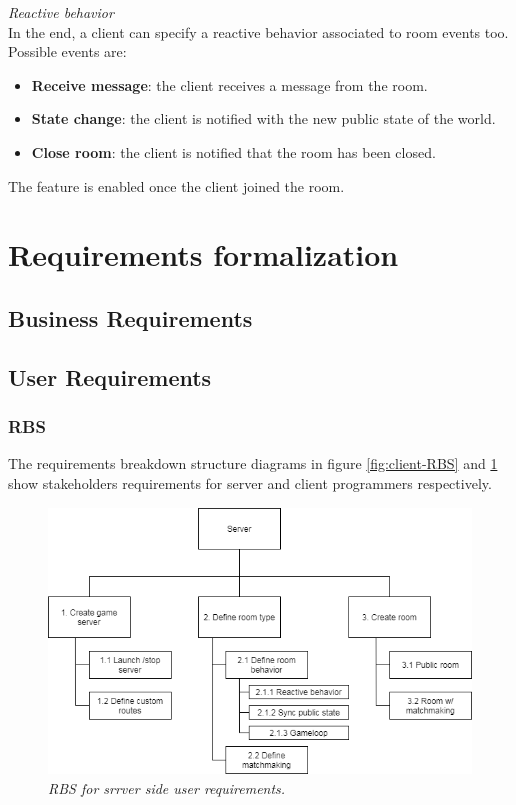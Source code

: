 \bigskip
\textit{Reactive behavior}
\\
In the end, a client can specify a reactive behavior associated to room events too. Possible events are:
\begin{itemize}
\item \textbf{Receive message}: the client receives a message from the room.
\item \textbf{State change}: the client is notified with the new public state of the world.
\item \textbf{Close room}: the client is notified that the room has been closed.
\end{itemize} 
The feature is enabled once the client joined the room. 

\section{Requirements formalization}

\subsection{Business Requirements}

\subsection{User Requirements}

\subsubsection{RBS}

The requirements breakdown structure diagrams in figure \ref{fig:client-RBS} and \ref{fig:server-RBS} show stakeholders requirements for server and client programmers respectively.  

\begin{figure}[H]
  \includegraphics[scale=0.5]{images/2-scoping/server-RBS.png}
   \centering  
   \caption{\textit{RBS for srrver side user requirements.}}
  \label{fig:server-RBS}
\end{figure}

